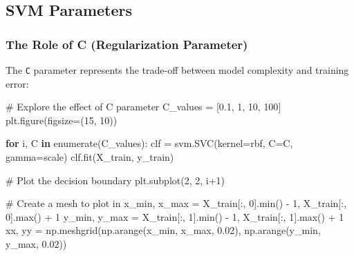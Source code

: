 \documentclass[
  letterpaper,
  DIV=11,
  numbers=noendperiod]{scrreprt}
\newenvironment{Shaded}{\begin{snugshade}}{\end{snugshade}}
\newcommand{\BuiltInTok}[1]{\textcolor[rgb]{0.00,0.23,0.31}{#1}}
\newcommand{\CommentTok}[1]{\textcolor[rgb]{0.37,0.37,0.37}{#1}}
\newcommand{\ControlFlowTok}[1]{\textcolor[rgb]{0.00,0.23,0.31}{\textbf{#1}}}
\newcommand{\DecValTok}[1]{\textcolor[rgb]{0.68,0.00,0.00}{#1}}
\newcommand{\FloatTok}[1]{\textcolor[rgb]{0.68,0.00,0.00}{#1}}
\newcommand{\KeywordTok}[1]{\textcolor[rgb]{0.00,0.23,0.31}{\textbf{#1}}}
\newcommand{\NormalTok}[1]{\textcolor[rgb]{0.00,0.23,0.31}{#1}}
\newcommand{\OperatorTok}[1]{\textcolor[rgb]{0.37,0.37,0.37}{#1}}
\newcommand{\StringTok}[1]{\textcolor[rgb]{0.13,0.47,0.30}{#1}}
\begin{document}
\subsection{SVM Parameters}\label{svm-parameters}

\subsubsection{The Role of C (Regularization
Parameter)}\label{the-role-of-c-regularization-parameter}

The \texttt{C} parameter represents the trade-off between model
complexity and training error:

\begin{Shaded}
\begin{Highlighting}[]
\CommentTok{\# Explore the effect of C parameter}
\NormalTok{C\_values }\OperatorTok{=}\NormalTok{ [}\FloatTok{0.1}\NormalTok{, }\DecValTok{1}\NormalTok{, }\DecValTok{10}\NormalTok{, }\DecValTok{100}\NormalTok{]}
\NormalTok{plt.figure(figsize}\OperatorTok{=}\NormalTok{(}\DecValTok{15}\NormalTok{, }\DecValTok{10}\NormalTok{))}

\ControlFlowTok{for}\NormalTok{ i, C }\KeywordTok{in} \BuiltInTok{enumerate}\NormalTok{(C\_values):}
\NormalTok{    clf }\OperatorTok{=}\NormalTok{ svm.SVC(kernel}\OperatorTok{=}\StringTok{\textquotesingle{}rbf\textquotesingle{}}\NormalTok{, C}\OperatorTok{=}\NormalTok{C, gamma}\OperatorTok{=}\StringTok{\textquotesingle{}scale\textquotesingle{}}\NormalTok{)}
\NormalTok{    clf.fit(X\_train, y\_train)}
    
    \CommentTok{\# Plot the decision boundary}
\NormalTok{    plt.subplot(}\DecValTok{2}\NormalTok{, }\DecValTok{2}\NormalTok{, i}\OperatorTok{+}\DecValTok{1}\NormalTok{)}
    
    \CommentTok{\# Create a mesh to plot in}
\NormalTok{    x\_min, x\_max }\OperatorTok{=}\NormalTok{ X\_train[:, }\DecValTok{0}\NormalTok{].}\BuiltInTok{min}\NormalTok{() }\OperatorTok{{-}} \DecValTok{1}\NormalTok{, X\_train[:, }\DecValTok{0}\NormalTok{].}\BuiltInTok{max}\NormalTok{() }\OperatorTok{+} \DecValTok{1}
\NormalTok{    y\_min, y\_max }\OperatorTok{=}\NormalTok{ X\_train[:, }\DecValTok{1}\NormalTok{].}\BuiltInTok{min}\NormalTok{() }\OperatorTok{{-}} \DecValTok{1}\NormalTok{, X\_train[:, }\DecValTok{1}\NormalTok{].}\BuiltInTok{max}\NormalTok{() }\OperatorTok{+} \DecValTok{1}
\NormalTok{    xx, yy }\OperatorTok{=}\NormalTok{ np.meshgrid(np.arange(x\_min, x\_max, }\FloatTok{0.02}\NormalTok{),}
\NormalTok{                         np.arange(y\_min, y\_max, }\FloatTok{0.02}\NormalTok{))}
    

\end{Highlighting}
\end{Shaded}
\end{document}
